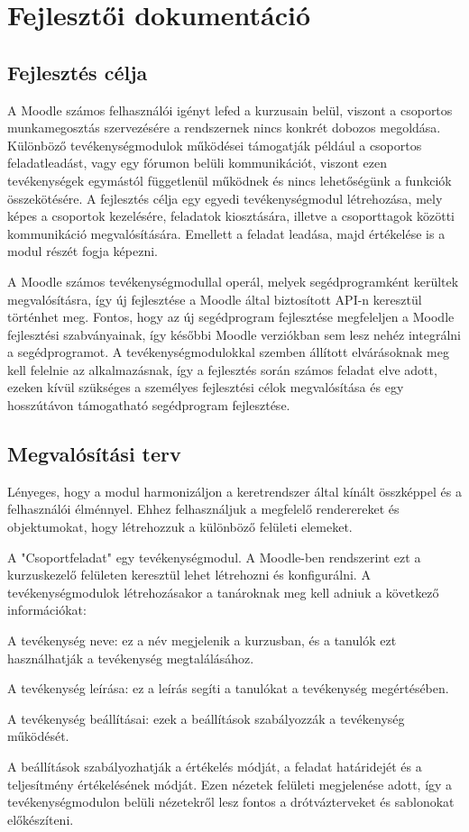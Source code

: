 \chapter{Fejlesztői dokumentáció}
\label{ch:impl}

\section{Fejlesztés célja}

A Moodle számos felhasználói igényt lefed a kurzusain belül, viszont a csoportos munkamegosztás szervezésére a rendszernek nincs konkrét dobozos megoldása. Különböző tevékenységmodulok működései támogatják például a csoportos feladatleadást, vagy egy fórumon belüli kommunikációt, viszont ezen tevékenységek egymástól függetlenül működnek és nincs lehetőségünk a funkciók összekötésére. A fejlesztés célja egy egyedi tevékenységmodul létrehozása, mely képes a csoportok kezelésére, feladatok kiosztására, illetve a csoporttagok közötti kommunikáció megvalósítására. Emellett a feladat leadása, majd értékelése is a modul részét fogja képezni. 

A Moodle számos tevékenységmodullal operál, melyek segédprogramként kerültek megvalósításra, így új fejlesztése a Moodle által biztosított API-n keresztül történhet meg. Fontos, hogy az új segédprogram fejlesztése megfeleljen a Moodle fejlesztési szabványainak, így későbbi Moodle verziókban sem lesz nehéz integrálni a segédprogramot. A tevékenységmodulokkal szemben állított elvárásoknak meg kell felelnie az alkalmazásnak, így a fejlesztés során számos feladat elve adott, ezeken kívül szükséges a személyes fejlesztési célok megvalósítása és egy hosszútávon támogatható segédprogram fejlesztése.

\section{Megvalósítási terv}

Lényeges, hogy a modul harmonizáljon a keretrendszer által kínált összképpel és a felhasználói élménnyel. Ehhez felhasználjuk a megfelelő renderereket és objektumokat, hogy létrehozzuk a különböző felületi elemeket.

A "Csoportfeladat" egy tevékenységmodul. A Moodle-ben rendszerint ezt a kurzuskezelő felületen keresztül lehet létrehozni és konfigurálni. A tevékenységmodulok létrehozásakor a tanároknak meg kell adniuk a következő információkat:
\begin{compactitem}
    \item A tevékenység neve: ez a név megjelenik a kurzusban, és a tanulók ezt használhatják a tevékenység megtalálásához.
    \item A tevékenység leírása: ez a leírás segíti a tanulókat a tevékenység megértésében.
    \item A tevékenység beállításai: ezek a beállítások szabályozzák a tevékenység működését.
\end{compactitem}
A beállítások szabályozhatják a értékelés módját, a feladat határidejét és a teljesítmény értékelésének módját.
Ezen nézetek felületi megjelenése adott, így a tevékenységmodulon belüli nézetekről lesz fontos a drótvázterveket és sablonokat előkészíteni.

